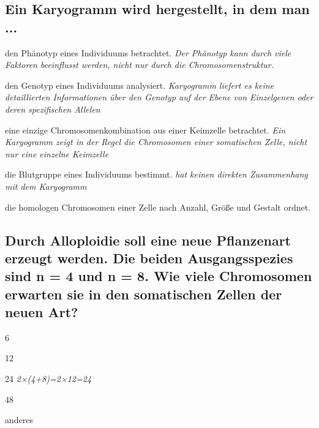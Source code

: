 \documentclass{article}
\newcommand{\cmark}{\ding{51}}%
\newcommand{\done}{\rlap{$\square$}{\raisebox{2pt}{\large\hspace{1pt}\cmark}}%
\hspace{-2.5pt}}
\begin{document}
\subsection*{Ein Karyogramm wird hergestellt, in dem man ...}
\begin{todolist}%
\item den Phänotyp eines Individuums betrachtet. \textit{\scriptsize Der Phänotyp kann durch viele Faktoren beeinflusst werden, nicht nur durch die Chromosomenstruktur.}
\item den Genotyp eines Individuums analysiert. \textit{\scriptsize Karyogramm liefert es keine detaillierten Informationen über den Genotyp auf der Ebene von Einzelgenen oder deren spezifischen Allelen}
\item eine einzige Chromosomenkombination aus einer Keimzelle
betrachtet. \textit{\scriptsize Ein Karyogramm zeigt in der Regel die Chromosomen einer somatischen Zelle, nicht nur eine einzelne Keimzelle}
\item die Blutgruppe eines Individuums bestimmt. \textit{\scriptsize hat keinen direkten Zusammenhang mit dem Karyogramm}
\item[\done] die homologen Chromosomen einer Zelle nach Anzahl, Größe
und Gestalt ordnet.
\end{todolist}
\subsection*{Durch Alloploidie soll eine neue Pflanzenart erzeugt werden. Die beiden
Ausgangsspezies sind n = 4 und n = 8. Wie viele Chromosomen erwarten
sie in den somatischen Zellen der neuen Art?}
\begin{todolist}%
\item 6 
\item 12 
\item[\done] 24 \textit{\scriptsize 2×(4+8)=2×12=24}
\item 48
\item anderes
\end{todolist}
\end{document}
